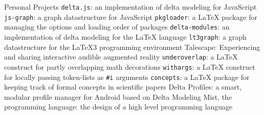 
\begin{rubric}{Personal Projects}
		\verb|delta.js|: an implementation of delta modeling for JavaScript
		\hfill{}
		\verb|js-graph|: a graph datastructure for JavaScript
		\hfill{}
		\verb|pkgloader|: a \LaTeX{} package for managing the options and loading order of packages
		\hfill{}
		\verb|delta-modules|: an implementation of delta modeling for the \LaTeX{} language
		\hfill{}
		\verb|lt3graph|: a graph datastructure for the \LaTeX3 programming environment
		\hfill{}
		Talescape: Experiencing and sharing interactive audible augmented reality
		\hfill{}
		\verb|underoverlap|: a \LaTeX{} construct for partly overlapping math decorations
		\hfill{}
		\verb|withargs|: a \LaTeX{} construct for locally passing token-lists as \verb~#i~ arguments
		\hfill{}
		\verb|concepts|: a \LaTeX{} package for keeping track of formal concepts in scientific papers
		\hfill{}
		Delta Profiles: a smart, modular profile manager for Android based on Delta Modeling
		\hfill{}
		Mist, the programming language: the design of a high level programming language
		\hfill{}
\end{rubric}

